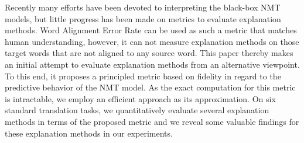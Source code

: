 Recently many efforts have been devoted to interpreting the black-box NMT models, but little progress has been made on metrics to evaluate explanation methods. Word Alignment Error Rate can be used as such a metric that matches human understanding, however, it can not measure explanation methods on those target words that are not aligned to any source word. This paper thereby makes an initial attempt to evaluate explanation methods from an alternative viewpoint. To this end, it proposes a principled metric based on fidelity in regard to the predictive behavior of the NMT model. As the exact computation for this metric is intractable, we employ an efficient approach as its approximation. On six standard translation tasks, we quantitatively evaluate several explanation methods in terms of the proposed metric and we reveal some valuable findings for these explanation methods in our experiments.
